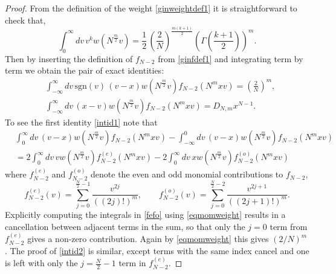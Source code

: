 \documentclass[11pt,reqno]{amsproc}
\numberwithin{equation}{section}
\numberwithin{theorem}{section}
\begin{document}
\begin{proof}
From the definition of the weight \eqref{ginweightdef1} it is straightforward to check that,
\begin{equation}
\int_{0}^{\infty}dv\,v^{k}w(N^{\frac{m}{2}}v) = \frac{1}{2}\,\left(\frac{2}{N}\right)^{\frac{m(k+1)}{2}}\left(\Gamma\left(\frac{k+1}{2}\right)\right)^{m}.\label{eqmomweight}
\end{equation}
Then by inserting the definition of $f_{N-2}$ from \eqref{ginfdef1} and integrating term by term we obtain the pair of exact identities:
\begin{align}
&\int_{-\infty}^{\infty}dv\,\mathrm{sgn}(v)\,(v-x)w(N^{\frac{m}{2}}v)f_{N-2}(N^{m}xv) = \left(\frac{2}{N}\right)^{m},\label{intid1}\\
&\int_{-\infty}^{\infty}dv\,(x-v)w(N^{\frac{m}{2}}v)f_{N-2}(N^{m}xv) = D_{N,m}x^{N-1}. \label{intid2}
\end{align}
To see the first identity \eqref{intid1} note that
\begin{align}
&\int_{0}^{\infty}dv\,(v-x)w(N^{\frac{m}{2}}v)f_{N-2}(N^{m}xv)-\int_{-\infty}^{0}dv\,(v-x)w(N^{\frac{m}{2}}v)f_{N-2}(N^{m}xv)\\
&=2\int_{0}^{\infty}dv\,vw(N^{\frac{m}{2}}v)f^{(e)}_{N-2}(N^{m}xv)-2\int_{0}^{\infty}dv\,xw(N^{\frac{m}{2}}v)f^{(o)}_{N-2}(N^{m}xv) \label{fefo}
\end{align}
where $f_{N-2}^{(e)}$ and $f_{N-2}^{(o)}$ denote the even and odd monomial contributions to $f_{N-2}$,
\begin{equation}
 f^{(e)}_{N-2}(v) = \sum_{j=0}^{\frac{N}{2}-1}\frac{v^{2j}}{((2j)!)^{m}}, \qquad
 f^{(o)}_{N-2}(v) = \sum_{j=0}^{\frac{N}{2}-2}\frac{v^{2j+1}}{((2j+1)!)^{m}}.
\end{equation}
Explicitly computing the integrals in \eqref{fefo} using \eqref{eqmomweight} results in a cancellation between adjacent terms in the sum, so that only the $j=0$ term from $f^{(e)}_{N-2}$ gives a non-zero contribution. Again by \eqref{eqmomweight}  this gives $(2/N)^{m}$. The proof of \eqref{intid2} is similar, except terms with the same index cancel and one is left with only the $j=\frac{N}{2}-1$ term in $f^{(e)}_{N-2}$.


\end{proof}
\end{document}
